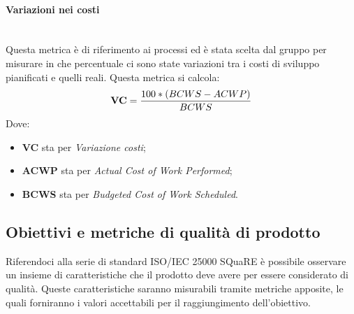 \paragraph{Variazioni nei costi}\mbox{}\\
Questa metrica è di riferimento ai processi ed è stata scelta dal gruppo per misurare in che percentuale ci sono state variazioni tra i costi di sviluppo pianificati e quelli reali. Questa metrica si calcola:
\begin{align*}
	\centering
	\textbf{VC} = \frac{100 * (BCWS - ACWP)}{BCWS}
\end{align*}
Dove:
\begin{itemize}
	\item \textbf{VC} sta per \textit{Variazione costi};
	\item \textbf{ACWP} sta per \textit{Actual Cost of Work Performed};
	\item \textbf{BCWS} sta per \textit{Budgeted Cost of Work Scheduled}.
\end{itemize}
\newpage
\subsection{Obiettivi e metriche di qualità di prodotto}
Riferendoci alla serie di standard ISO/IEC 25000 SQuaRE è possibile osservare un insieme di caratteristiche che il prodotto deve avere per essere considerato di qualità. Queste caratteristiche saranno misurabili tramite metriche apposite, le quali forniranno i valori accettabili per il raggiungimento dell'obiettivo.
